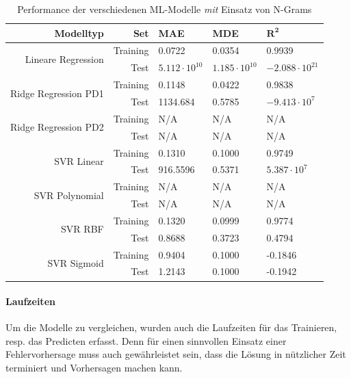 \documentclass[10pt, a4paper]{article}
\begin{document}
\begin{table}[ht]
	\begin{tabular}[c]{|r|r|l|l|l|}
		\hline
		\textbf{Modelltyp} & \textbf{Set} & \textbf{MAE} & \textbf{MDE}	& \(\mathbf{R^2}\) \\ \hline
		\multirow{2}{*}{Lineare Regression}
		& Training 	& 0.0722 & 0.0354 & 0.9939 \\ \cline{2-5}
		& Test 		& \(5.112 \cdot 10^{10}\) & \(1.185 \cdot 10^{10}\) & \(-2.088 \cdot 10^{21}\) \\ \hline
		\multirow{2}{*}{Ridge Regression PD1}
		& Training 	& 0.1148 & 0.0422 & 0.9838 \\ \cline{2-5}
		& Test 		& 1134.684 & 0.5785 & \(-9.413 \cdot 10^7\) \\ \hline
		\multirow{2}{*}{Ridge Regression PD2}
		& Training 	& N/A & N/A & N/A \\ \cline{2-5}
		& Test 		& N/A & N/A & N/A \\ \hline
		\multirow{2}{*}{SVR Linear}
		& Training 	& 0.1310 & 0.1000 & 0.9749 \\ \cline{2-5}
		& Test 		& 916.5596 & 0.5371 & \(5.387 \cdot 10^7\) \\ \hline
		\multirow{2}{*}{SVR Polynomial}
		& Training 	& N/A & N/A & N/A \\ \cline{2-5}
		& Test 		& N/A & N/A & N/A \\ \hline
		\multirow{2}{*}{SVR RBF}
		& Training 	& 0.1320 & 0.0999 & 0.9774 \\ \cline{2-5}
		& Test 		& 0.8688 & 0.3723 & 0.4794 \\ \hline
		\multirow{2}{*}{SVR Sigmoid}
		& Training 	& 0.9404 & 0.1000 & -0.1846 \\ \cline{2-5}
		& Test 		& 1.2143 & 0.1000 & -0.1942 \\ \hline
	\end{tabular}
	\centering
	\caption{Performance der verschiedenen \ac{ML}-Modelle \emph{mit} Einsatz von N-Grams}
	\label{tab:results_with_ngrams}
\end{table}

\paragraph{Laufzeiten}
Um die Modelle zu vergleichen, wurden auch die Laufzeiten für das Trainieren, resp. das Predicten erfasst. Denn für einen sinnvollen Einsatz einer Fehlervorhersage muss auch gewährleistet sein, dass die Lösung in nützlicher Zeit terminiert und Vorhersagen machen kann.
\end{document}
